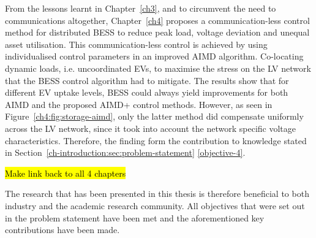 From the lessons learnt in Chapter~\ref{ch3}, and to circumvent the need to communications altogether, Chapter~\ref{ch4} proposes a communication-less control method for distributed BESS to reduce peak load, voltage deviation and unequal asset utilisation.
This communication-less control is achieved by using individualised control parameters in an improved AIMD algorithm.
Co-locating dynamic loads, i.e. uncoordinated EVs, to maximise the stress on the LV network that the BESS control algorithm had to mitigate.
The results show that for different EV uptake levels, BESS could always yield improvements for both AIMD and the proposed AIMD+ control methods.
However, as seen in Figure~\ref{ch4:fig:storage-aimd}, only the latter method did compensate uniformly across the LV network, since it took into account the network specific voltage characteristics.
Therefore, the finding form the contribution to knowledge stated in Section~\ref{ch-introduction:sec:problem-statement} \ref{objective-4}.

\hl{Make link back to all 4 chapters}

The research that has been presented in this thesis is therefore beneficial to both industry and the academic research community.
All objectives that were set out in the problem statement have been met and the aforementioned key contributions have been made.


